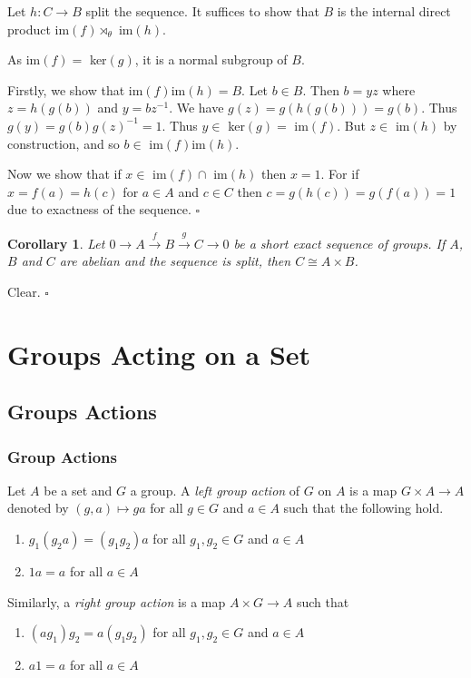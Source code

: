 \documentclass[10pt]{article}
\newtheorem{corollary}[theorem]{Corollary}
\newenvironment{proof}[1][Proof]{\begin{trivlist}
\item[\hskip \labelsep {\itshape #1}]}{\end{trivlist}}
\newenvironment{definition}[1][Definition]{\begin{trivlist}
\item[\hskip \labelsep {\bfseries #1}]}{\end{trivlist}}
\begin{document}
\begin{proof}
Let $h : C \to B$ split the sequence. It suffices to show that $B$ is the internal direct product im$(f)\rtimes_{\theta}$ im$(h)$.

As im$(f) =$ ker$(g)$, it is a normal subgroup of $B$.

Firstly, we show that im$(f)$im$(h) = B$. Let $b \in B$. Then $b = yz$ where $z = h(g(b))$ and $y = bz^{-1}$. We have $g(z) = g(h(g(b))) = g(b)$. Thus $g(y) = g(b)g(z)^{-1} = 1$. Thus $y \in$ ker$(g) =$ im$(f)$. But $z \in$ im$(h)$ by construction, and so $b \in$ im$(f)$im$(h)$.

Now we show that if $x \in$ im$(f)\cap$ im$(h)$ then $x = 1$. For if $x = f(a) = h(c)$ for $a \in A$ and $c \in C$ then $c = g(h(c)) = g(f(a)) = 1$ due to exactness of the sequence. $\square$
\end{proof}

\begin{corollary}
Let $0 \longrightarrow A \overset{f}{\longrightarrow} B \overset{g}{\longrightarrow} C \longrightarrow 0$ be a short exact sequence of groups. If $A$, $B$ and $C$ are abelian and the sequence is split, then $C \cong A\times B$.
\end{corollary}

\begin{proof}
Clear. $\square$
\end{proof}

\section{Groups Acting on a Set}

\subsection{Groups Actions}

\subsubsection{Group Actions}

\begin{definition}
Let $A$ be a set and $G$ a group. A \emph{left group action} of $G$ on $A$ is a map $G\times A \to A$ denoted by $(g, a) \mapsto ga$ for all $g \in G$ and $a \in A$ such that the following hold.
\begin{enumerate}
\item $g_1(g_2a) = (g_1g_2)a$ for all $g_1, g_2 \in G$ and $a \in A$
\item $1a = a$ for all $a \in A$
\end{enumerate}
Similarly, a \emph{right group action} is a map $A\times G \to A$ such that
\begin{enumerate}
\item $(ag_1)g_2 = a(g_1g_2)$ for all $g_1, g_2 \in G$ and $a \in A$
\item $a1 = a$ for all $a \in A$
\end{enumerate}
\end{definition}
\end{document}
